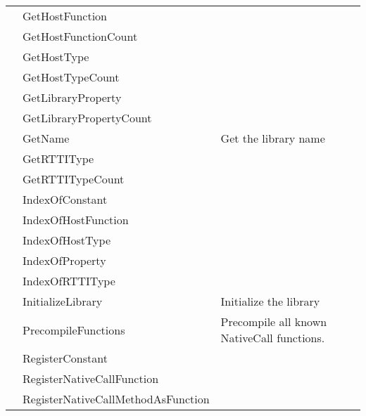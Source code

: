 \begin{tabularx}{\textwidth}{llX}
\pageref{thoriumcorepkg:thorium:tthoriumlibrary:gethostfunction} & GetHostFunction  &  \\
\pageref{thoriumcorepkg:thorium:tthoriumlibrary:gethostfunctioncount} & GetHostFunctionCount  &  \\
\pageref{thoriumcorepkg:thorium:tthoriumlibrary:gethosttype} & GetHostType  &  \\
\pageref{thoriumcorepkg:thorium:tthoriumlibrary:gethosttypecount} & GetHostTypeCount  &  \\
\pageref{thoriumcorepkg:thorium:tthoriumlibrary:getlibraryproperty} & GetLibraryProperty  &  \\
\pageref{thoriumcorepkg:thorium:tthoriumlibrary:getlibrarypropertycount} & GetLibraryPropertyCount  &  \\
\pageref{thoriumcorepkg:thorium:tthoriumlibrary:getname} & GetName  & Get the library name \\
\pageref{thoriumcorepkg:thorium:tthoriumlibrary:getrttitype} & GetRTTIType  &  \\
\pageref{thoriumcorepkg:thorium:tthoriumlibrary:getrttitypecount} & GetRTTITypeCount  &  \\
\pageref{thoriumcorepkg:thorium:tthoriumlibrary:indexofconstant} & IndexOfConstant  &  \\
\pageref{thoriumcorepkg:thorium:tthoriumlibrary:indexofhostfunction} & IndexOfHostFunction  &  \\
\pageref{thoriumcorepkg:thorium:tthoriumlibrary:indexofhosttype} & IndexOfHostType  &  \\
\pageref{thoriumcorepkg:thorium:tthoriumlibrary:indexofproperty} & IndexOfProperty  &  \\
\pageref{thoriumcorepkg:thorium:tthoriumlibrary:indexofrttitype} & IndexOfRTTIType  &  \\
\pageref{thoriumcorepkg:thorium:tthoriumlibrary:initializelibrary} & InitializeLibrary  & Initialize the library \\
\pageref{thoriumcorepkg:thorium:tthoriumlibrary:precompilefunctions} & PrecompileFunctions  & Precompile all known NativeCall functions. \\
\pageref{thoriumcorepkg:thorium:tthoriumlibrary:registerconstant} & RegisterConstant  &  \\
\pageref{thoriumcorepkg:thorium:tthoriumlibrary:registernativecallfunction} & RegisterNativeCallFunction  &  \\
\pageref{thoriumcorepkg:thorium:tthoriumlibrary:registernativecallmethodasfunction} & RegisterNativeCallMethodAsFunction  &  \\

\end{tabularx}

